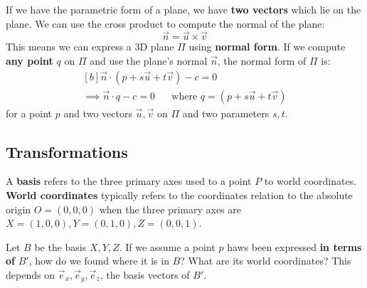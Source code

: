 \documentclass{article}
\begin{document}
If we have the parametric form of a plane, we have \textbf{two vectors} which lie on the plane. We can use the cross product to compute the normal of the plane:
\begin{equation}
	\vec{n} = \vec{u} \times \vec{v}
\end{equation}
This means we can express a 3D plane $\Pi$ using \textbf{normal form}. If we compute \textbf{any point} $q$ on $\Pi$ and use the plane's normal $\vec{n}$, the normal form of $\Pi$ is:
\begin{equation}
\begin{aligned}[b]
	\vec{n} \cdot (p + s\vec{u} + t\vec{v}) - c = 0 \\
	\implies \vec{n} \cdot q - c = 0
	\;\;\;\;\;\; \text{where }q = (p + s\vec{u} + t\vec{v})
\end{aligned}
	\label{eq:3d-plane-normal-form}
\end{equation}
for a point $p$ and two vectors $\vec{u},\vec{v}$ on $\Pi$ and two parameters $s,t$.

\subsection{Transformations}

A \textbf{basis} refers to the three primary axes used to  a point $P$ to world coordinates. \textbf{World coordinates} typically refers to the coordinates relation to the absolute origin $O = (0, 0, 0)$ when the three primary axes are $X = (1, 0, 0), Y = (0, 1, 0), Z = (0, 0, 1)$.

Let $B$ be the basis $X,Y,Z$. If we assume a point $p$ haws been expressed \textbf{in terms of} $B'$, how do we found where it is in $B$? What are its world coordinates? This depends on $\vec{e}_x,\vec{e}_y,\vec{e}_z$, the basis vectors of $B'$.
\end{document}
